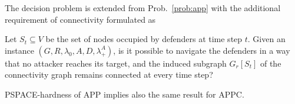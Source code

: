 The decision problem is extended from Prob.~\ref{prob:app} with the additional requirement of connectivity formulated as
\begin{problem}
	Let $S_t\subseteq V$ be the set of nodes occupied by defenders at time step $t$.
	Given an instance $(G,R,\lambda_0,A, D, \lambda_+^A)$, is it possible to navigate the defenders in a way that no attacker reaches its target,
	and the induced subgraph $G_r\left[S_t\right]$ of the connectivity graph remains connected at every time step?
\end{problem}
PSPACE-hardness of APP implies also the same result for APPC.

